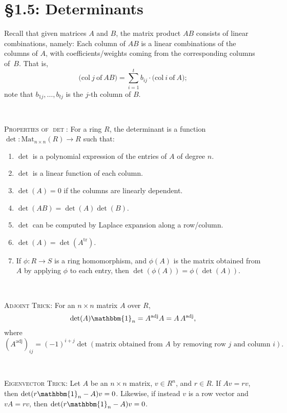 \documentclass[12pt]{amsart}
\newcommand{\1}{\mathbbm{1}}
\newcommand{\tr}{\mathrm{tr}}
\newcommand{\showsol}[1]{\def\displaysol{#1}}
\begin{document}
\showsol{1}
	
	\thispagestyle{empty}
	
	\section*{\S1.5: Determinants}	

\begin{framed}
Recall that given matrices $A$ and $B$, the matrix product $AB$ consists of linear combinations, namely:
Each column of $AB$ is a linear combinations of the columns of $A$, with coefficients/weights coming from the corresponding columns of~$B$. That is,
 \[ \big(\mathrm{col} \ j \ \text{of} \ AB\big) = \sum_{i=1}^t b_{ij} \cdot  \big(\mathrm{col} \ i \ \text{of} \ A);\]
 note that $b_{1j},\dots,b_{tj}$ is the $j$-th column of $B$.

\

\noindent \textsc{Properties of $\det$:} For a ring $R$, the determinant is a function $\det: \mathrm{Mat}_{n\times n}(R) \to R$ such that:
  \begin{enumerate}
  \item $\det$ is a polynomial expression of the entries of $A$ of degree $n$.
  \item $\det$ is a linear function of each column.
  \item $\det(A)=0$ if the columns are linearly dependent.
  \item $\det(AB)=\det(A)\det(B)$.
  \item $\det$ can be computed by Laplace expansion along a row/column.
  \item $\det(A) = \det(A^\tr)$.
  \item If $\phi:R\to S$ is a ring homomorphism, and $\phi(A)$ is the matrix obtained from $A$ by applying $\phi$ to each entry, then $\det(\phi(A)) = \phi(\det(A))$.
  \end{enumerate} 


\

\textsc{Adjoint Trick:} For an $n\times n$ matrix $A$ over $R$, 
\[\det(A) \mathbbm{1}_n = A^\mathrm{adj} A = A \, A^\mathrm{adj},\] where 
  $(A^\mathrm{adj})_{ij}=(-1)^{i+j} \det( \text{matrix obtained from $A$ by removing row $j$ and column $i$}).$

\


 \noindent \textsc{Eigenvector Trick:} Let $A$ be an $n\times n$ matrix, $v\in R^n$, and $r\in R$. If $Av=rv$, then ${\det(r \1_n - A) v = 0}$. Likewise, if instead $v$ is a row vector and $v A = rv$, then $\det(r \1_n - A) v = 0$.


\end{framed}
\end{document}
